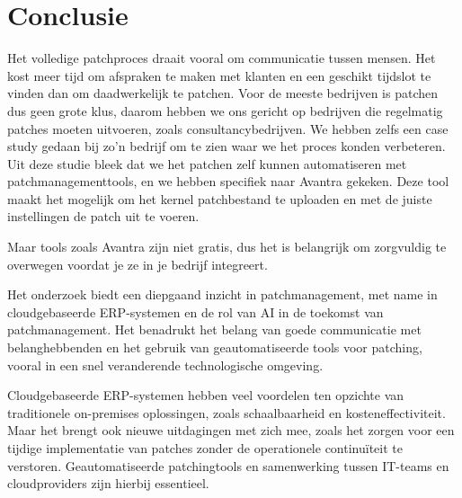 
\chapter{Conclusie}%
\label{ch:conclusie}


Het volledige patchproces draait vooral om communicatie tussen mensen. Het kost meer tijd om afspraken te maken met klanten en een geschikt tijdslot te vinden dan om daadwerkelijk te patchen. Voor de meeste bedrijven is patchen dus geen grote klus, daarom hebben we ons gericht op bedrijven die regelmatig patches moeten uitvoeren, zoals consultancybedrijven. We hebben zelfs een case study gedaan bij zo'n bedrijf om te zien waar we het proces konden verbeteren. Uit deze studie bleek dat we het patchen zelf kunnen automatiseren met patchmanagementtools, en we hebben specifiek naar Avantra gekeken. Deze tool maakt het mogelijk om het kernel patchbestand te uploaden en met de juiste instellingen de patch uit te voeren.

Maar tools zoals Avantra zijn niet gratis, dus het is belangrijk om zorgvuldig te overwegen voordat je ze in je bedrijf integreert.

Het onderzoek biedt een diepgaand inzicht in patchmanagement, met name in cloudgebaseerde ERP-systemen en de rol van AI in de toekomst van patchmanagement. Het benadrukt het belang van goede communicatie met belanghebbenden en het gebruik van geautomatiseerde tools voor patching, vooral in een snel veranderende technologische omgeving.

Cloudgebaseerde ERP-systemen hebben veel voordelen ten opzichte van traditionele on-premises oplossingen, zoals schaalbaarheid en kosteneffectiviteit. Maar het brengt ook nieuwe uitdagingen met zich mee, zoals het zorgen voor een tijdige implementatie van patches zonder de operationele continuïteit te verstoren. Geautomatiseerde patchingtools en samenwerking tussen IT-teams en cloudproviders zijn hierbij essentieel.

